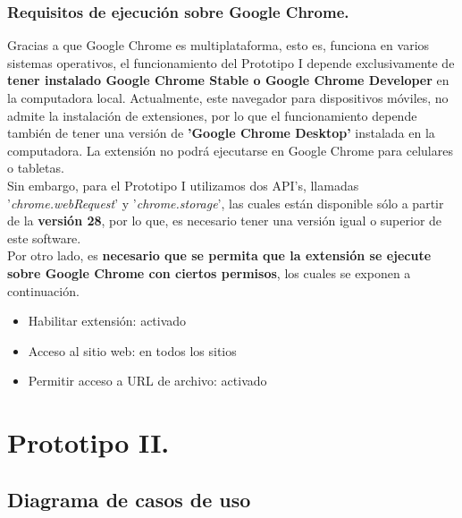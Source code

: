 \documentclass[12pt, a4paper, titlepage]{report}
\begin{document}
			   \subsubsection{Requisitos de ejecución sobre Google Chrome.}
			   Gracias a que Google Chrome es multiplataforma, esto es, funciona en varios sistemas operativos, el funcionamiento del Prototipo I depende exclusivamente de \textbf{tener instalado Google Chrome Stable o Google Chrome Developer} en la computadora local. Actualmente, este navegador para dispositivos móviles, no admite la instalación de extensiones, por lo que el funcionamiento depende también de tener una versión de \textbf{'Google Chrome Desktop'} instalada en la computadora. La extensión no podrá ejecutarse en Google Chrome para celulares o tabletas.\\
			   Sin embargo, para el Prototipo I utilizamos dos API's, llamadas \\ '\textit{chrome.webRequest}' y '\textit{chrome.storage}', las cuales están disponible sólo a partir de la\textbf{ versión 28}, por lo que, es necesario tener una versión igual o superior de este software.\\
			   Por otro lado, es \textbf{necesario que se permita que la extensión se ejecute sobre Google Chrome con ciertos permisos}, los cuales se exponen a continuación.
			   \begin{itemize}
			       \item Habilitar extensión: activado
			       \item Acceso al sitio web: en todos los sitios
			       \item Permitir acceso a URL de archivo: activado
			   \end{itemize}
			   
	    \newpage
			
		\section{Prototipo II.}
		    \subsection{Diagrama de casos de uso}
			    
\end{document}
